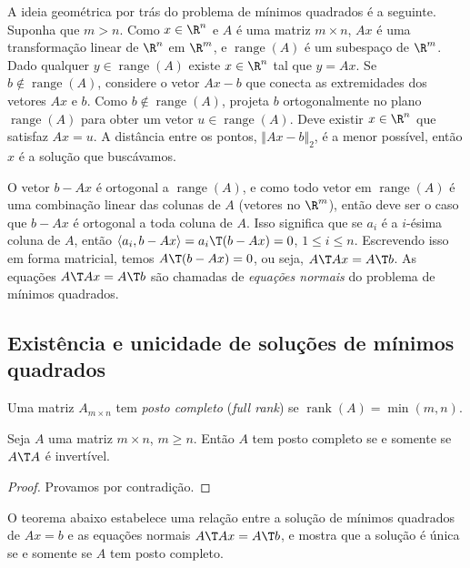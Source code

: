 \documentclass{article}
\DeclareMathOperator{\rank}{rank}
\DeclareMathOperator{\range}{range}
\begin{document}
A ideia geométrica por trás do problema de mínimos quadrados é a seguinte. Suponha que \(m > n\). Como \(x \in \R^n\) e \(A\) é uma matriz \(m \times n\), \(Ax\) é uma transformação linear de \(\R^n\) em \(\R^m\), e \(\range(A)\) é um subespaço de \(\R^m\). Dado qualquer \(y \in \range(A)\) existe \(x \in \R^n\) tal que \(y=Ax\). Se \(b \notin \range(A)\), considere o vetor \(Ax-b\) que conecta as extremidades dos vetores \(Ax\) e \(b\). Como \(b \notin \range(A)\), projeta \(b\) ortogonalmente no plano \(\range(A)\) para obter um vetor \(u \in \range(A)\). Deve existir \(x \in \R^n\) que satisfaz \(Ax=u\). A distância entre os pontos, \(\Vert Ax - b \Vert_2\), é a menor possível, então \(x\) é a solução que buscávamos.

O vetor \(b-Ax\) é ortogonal a \(\range(A)\), e como todo vetor em \(\range(A)\) é uma combinação linear das colunas de \(A\) (vetores no \(\R^m\)), então deve ser o caso que \(b-Ax\) é ortogonal a toda coluna de \(A\). Isso significa que se \(a_i\) é a \(i\)-ésima coluna de \(A\), então \(\langle a_i, b-Ax \rangle = a_i\T  (b-Ax) = 0\), \(1 \leq i \leq n\). Escrevendo isso em forma matricial, temos \(A\T (b-Ax) = 0\), ou seja, \(A\T Ax = A\T b\). As equações \(A\T Ax = A\T b\) são chamadas de \emph{equações normais} do problema de mínimos quadrados.

\subsection{Existência e unicidade de soluções de mínimos quadrados}

\begin{defn}
    Uma matriz \(A_{m \times n}\) tem \emph{posto completo} (\emph{full rank}) se \(\rank(A) = \min(m,n)\). 
\end{defn}

\begin{lem}\label{lem:posto_completo}
    Seja \(A\) uma matriz \(m \times n\), \(m \geq n\). Então \(A\) tem posto completo se e somente se \(A\T A\) é invertível.
\end{lem}

\begin{proof}
    Provamos por contradição.
\end{proof}

O teorema abaixo estabelece uma relação entre a solução de mínimos quadrados de \(Ax=b\) e as equações normais \(A\T Ax = A\T b\), e mostra que a solução é única se e somente se \(A\) tem posto completo.
\end{document}
